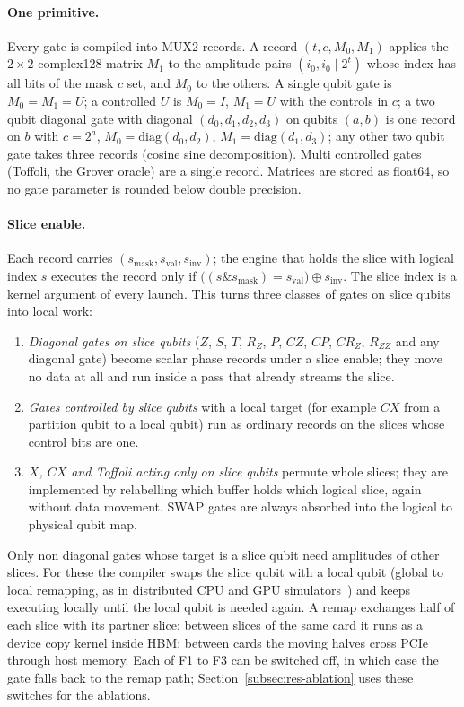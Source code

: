\documentclass[pdflatex,sn-mathphys-num]{sn-jnl}
\theoremstyle{thmstyleone}
\theoremstyle{thmstylethree}
\begin{document}
\paragraph{One primitive.} Every gate is compiled into MUX2 records. A record $(t, c, M_0, M_1)$ applies the
$2\times 2$ complex128 matrix $M_1$ to the amplitude pairs $(i_0, i_0 \mathbin{|} 2^t)$ whose index has all bits of the
mask $c$ set, and $M_0$ to the others. A single qubit gate is $M_0 = M_1 = U$; a controlled $U$ is $M_0 = I$,
$M_1 = U$ with the controls in $c$; a two qubit diagonal gate with diagonal $(d_0,d_1,d_2,d_3)$ on qubits $(a,b)$ is one
record on $b$ with $c = 2^a$, $M_0 = \mathrm{diag}(d_0,d_2)$, $M_1 = \mathrm{diag}(d_1,d_3)$; any other two qubit gate
takes three records (cosine sine decomposition). Multi controlled gates (Toffoli, the Grover oracle) are a single
record. Matrices are stored as float64, so no gate parameter is rounded below double precision.

\paragraph{Slice enable.} Each record carries $(s_{\mathrm{mask}}, s_{\mathrm{val}}, s_{\mathrm{inv}})$; the
engine that holds the slice with logical index $s$ executes the record only if
$\bigl((s \mathbin{\&} s_{\mathrm{mask}}) = s_{\mathrm{val}}\bigr) \oplus s_{\mathrm{inv}}$. The slice index is a
kernel argument of every launch. This turns three classes of gates on slice qubits into local work:
\begin{enumerate}
\item[F1] \emph{Diagonal gates on slice qubits} ($Z$, $S$, $T$, $R_Z$, $P$, $CZ$, $CP$, $CR_Z$, $R_{ZZ}$ and any diagonal
gate) become scalar phase records under a slice enable; they move no data at all and run inside a pass that already
streams the slice.
\item[F2] \emph{Gates controlled by slice qubits} with a local target (for example $CX$ from a partition qubit to a
local qubit) run as ordinary records on the slices whose control bits are one.
\item[F3] \emph{$X$, $CX$ and Toffoli acting only on slice qubits} permute whole slices; they are implemented by
relabelling which buffer holds which logical slice, again without data movement. SWAP gates are always absorbed into
the logical to physical qubit map.
\end{enumerate}
Only non diagonal gates whose target is a slice qubit need amplitudes of other slices. For these the compiler swaps
the slice qubit with a local qubit (global to local remapping, as in distributed CPU and GPU
simulators~\cite{haner2017petabyte,deraedt2019massively,imamura2022mpiqulacs}) and keeps executing locally until the
local qubit is needed again. A remap exchanges half of each slice with its partner slice: between slices of the same
card it runs as a device copy kernel inside HBM; between cards the moving halves cross PCIe through host memory.
Each of F1 to F3 can be switched off, in which case the gate falls back to the remap path; Section~\ref{subsec:res-ablation}
uses these switches for the ablations.
\end{document}
